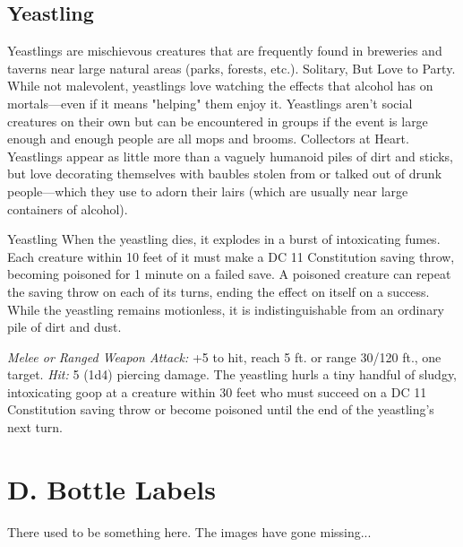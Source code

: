 \documentclass[10pt,a4paper,twoside,twocolumn,openany,bg=print,nodeprecatedcode]{dndbook}
\begin{document}
\subsection{Yeastling}
Yeastlings are mischievous creatures that are frequently found in breweries and taverns near large natural areas (parks, forests, etc.).
Solitary, But Love to Party. While not malevolent, yeastlings love watching the effects that alcohol has on mortals—even if it means "helping" them enjoy it. Yeastlings aren't social creatures on their own but can be encountered in groups if the event is large enough and enough people are all mops and brooms.
Collectors at Heart. Yeastlings appear as little more than a vaguely humanoid piles of dirt and sticks, but love decorating themselves with baubles stolen from or talked out of drunk people—which they use to adorn their lairs (which are usually near large containers of alcohol).

\begin{DndMonster}[float*=t]{Yeastling}
\DndMonsterBasics[
armor-class = {15},
hit-points = {\DndDice{8d6+8}},
speed = {40 ft.}
]
\DndMonsterAbilityScores[
 str = 6,
 dex = 16,
 con = 13,
 int = 8,
 wis = 14,
 cha = 16
]
\DndMonsterDetails[
skills = {Perception +4, Persuasion +5, Sleight Of Hand +5},
damage-immunities = {poison},
senses = {tremorsense 30 ft., passive perception 14},
languages = {Sylvan},
challenge = 1/2,
]
When the yeastling dies, it explodes in a burst of intoxicating fumes. Each creature within 10 feet of it must make a DC 11 Constitution saving throw, becoming poisoned for 1 minute on a failed save. A poisoned creature can repeat the saving throw on each of its turns, ending the effect on itself on a success.
While the yeastling remains motionless, it is indistinguishable from an ordinary pile of dirt and dust.
\par
{}
\textsl{Melee or Ranged Weapon Attack:} +5 to hit, reach 5 ft. or range 30/120 ft., one target. \textsl{Hit:} 5 (1d4) piercing damage.
The yeastling hurls a tiny handful of sludgy, intoxicating goop at a creature within 30 feet who must succeed on a DC 11 Constitution saving throw or become poisoned until the end of the yeastling's next turn.
\end{DndMonster}


\section{D. Bottle Labels}
There used to be something here. The images have gone missing...
\end{document}
